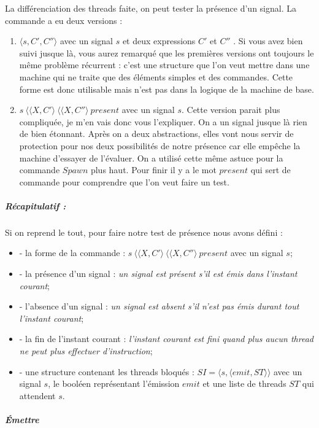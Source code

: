 \documentclass[10pt,a4paper]{report}
\begin{document}
	La différenciation des threads faite, on peut tester la présence d'un signal. La commande a eu deux versions :
	\begin{enumerate}
		\item $\langle s,C',C''\rangle$ avec un signal $s$ et deux expressions $C'$ et $C''$ . Si vous avez bien suivi jusque là, vous aurez remarqué que les premières versions ont toujours le même problème récurrent : c'est une structure que l'on veut mettre dans une machine qui ne traite que des éléments simples et des commandes. Cette forme est donc utilisable mais n'est pas dans la logique de la machine de base.
		\item $s~\langle\langle X,C'\rangle~\langle\langle X,C''\rangle~present$ avec un signal $s$. Cette version parait plus compliquée, je m'en vais donc vous l'expliquer. On a un signal jusque là rien de bien étonnant. Après on a deux abstractions, elles vont nous servir de protection pour nos deux possibilités de notre présence car elle empêche la machine d'essayer de l'évaluer. On a utilisé cette même astuce pour la commande $Spawn$ plus haut. Pour finir il y a le mot $present$ qui sert de commande pour comprendre que l'on veut faire un test.
	\end{enumerate} 
	\bigbreak
	
	
	\subparagraph{Récapitulatif :} Si on reprend le tout, pour faire notre test de présence nous avons défini :
	\begin{itemize}
		\item[] - la forme de la commande : $s~\langle\langle X,C'\rangle~\langle\langle X,C''\rangle~present$ avec un signal $s$;
		\item[] - la présence d'un signal : \textit{un signal est présent s'il est émis dans l'instant courant};
		\item[] - l'absence d'un signal : \textit{un signal est absent s'il n'est pas émis durant tout l'instant courant};
		\item[] - la fin de l'instant courant : \textit{l'instant courant est fini quand plus aucun thread ne peut plus effectuer d'instruction};
		\item[] - une structure contenant les threads bloqués : $SI = \langle s , \langle emit , ST \rangle\rangle$ avec un signal $s$, le booléen représentant l'émission $emit$ et une liste de threads $ST$ qui attendent $s$.
	\end{itemize}
	\bigbreak
	\bigbreak
	
	
	
	
	\subparagraph{Émettre}
	
\end{document}
